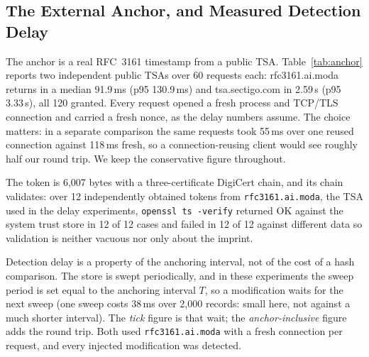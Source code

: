 \documentclass[conference]{IEEEtran}
\begin{document}
\subsection{The External Anchor, and Measured Detection Delay}
\label{sec:anchor}
The anchor is a real RFC~3161 timestamp from a public TSA. Table~\ref{tab:anchor} reports two independent
public TSAs over 60 requests each: rfc3161.ai.moda returns in a median 91.9\,ms (p95 130.9\,ms) and
tsa.sectigo.com in 2.59\,s (p95 3.33\,s), all 120 granted. Every request opened a fresh process and TCP/TLS
connection and carried a fresh nonce, as the delay numbers assume. The choice matters: in a separate comparison
the same requests took 55\,ms over one reused connection against 118\,ms fresh, so a connection-reusing client
would see roughly half our round trip. We keep the conservative figure throughout.

The token is 6{,}007 bytes with a three-certificate DigiCert chain, and its chain validates: over 12
independently obtained tokens from \texttt{rfc3161.ai.moda}, the TSA used in the delay experiments,
\texttt{openssl ts -verify} returned OK against the system trust store in 12 of 12 cases and failed in 12 of 12
against different data so validation is neither vacuous nor only about the imprint.

Detection delay is a property of the anchoring interval, not of the cost of a hash comparison. The store is
swept periodically, and in these experiments the sweep period is set equal to the anchoring interval $T$, so a
modification waits for the next sweep (one sweep costs 38\,ms over 2{,}000 records: small here, not against a
much shorter interval). The \emph{tick} figure is that wait; the \emph{anchor-inclusive} figure adds the round
trip. Both used \texttt{rfc3161.ai.moda} with a fresh connection per request, and every injected modification
was detected.
\end{document}
